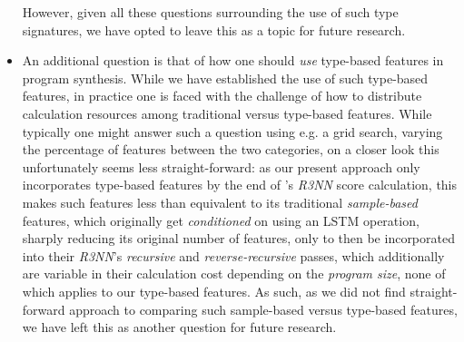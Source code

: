 \documentclass{article}
\begin{document}
\begin{itemize}
    However, given all these questions surrounding the use of such type signatures,
    we have opted to leave this as a topic for future research.
    \item An additional question is that of how one should \emph{use} type-based features in program synthesis.
    While we have established the use of such type-based features,
    in practice one is faced with the challenge of how to distribute calculation resources among traditional versus type-based features.
    While typically one might answer such a question using e.g. a grid search,
    varying the percentage of features between the two categories,
    on a closer look this unfortunately seems less straight-forward:
    as our present approach only incorporates type-based features by the end of \citet{nsps}'s \emph{R3NN} score calculation,
    this makes such features less than equivalent to its traditional \emph{sample-based} features,
    which originally get \emph{conditioned} on using an LSTM operation,
    sharply reducing its original number of features,
    only to then be incorporated into their \emph{R3NN}'s \emph{recursive} and \emph{reverse-recursive} passes,
    which additionally are variable in their calculation cost depending on the \emph{program size},
    none of which applies to our type-based features.
    As such, as we did not find straight-forward approach to comparing such sample-based versus type-based features,
    we have left this as another question for future research.
\end{itemize}


\nocite{*}
% 

\end{document}
